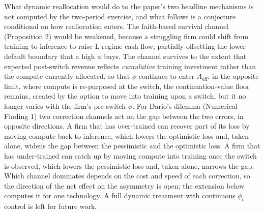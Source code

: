 \documentclass[
  11pt,
  letterpaper,
]{scrartcl}
\begin{document}
What dynamic reallocation would do to the paper's two headline
mechanisms is not computed by the two-period exercise, and what follows
is a conjecture conditional on how reallocation enters. The faith-based
survival channel (Proposition 2) would be weakened, because a struggling
firm could shift from training to inference to raise L-regime cash flow,
partially offsetting the lower default boundary that a high \(\phi\)
buys. The channel survives to the extent that expected post-switch
revenue reflects \emph{cumulative} training investment rather than the
compute currently allocated, so that \(\phi\) continues to enter
\(A_{\text{eff}}\); in the opposite limit, where compute is re-purposed
at the switch, the continuation-value floor remains, created by the
option to move into training upon a switch, but it no longer varies with
the firm's pre-switch \(\phi\). For Dario's dilemma (Numerical Finding
1) two correction channels act on the gap between the two errors, in
opposite directions. A firm that has over-trained can recover part of
its loss by moving compute back to inference, which lowers the
optimistic loss and, taken alone, widens the gap between the pessimistic
and the optimistic loss. A firm that has under-trained can catch up by
moving compute into training once the switch is observed, which lowers
the pessimistic loss and, taken alone, narrows the gap. Which channel
dominates depends on the cost and speed of each correction, so the
direction of the net effect on the asymmetry is open; the extension
below computes it for one technology. A full dynamic treatment with
continuous \(\phi_t\) control is left for future work.
\end{document}

